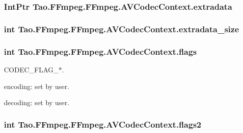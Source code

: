 \hypertarget{struct_tao_1_1_f_fmpeg_1_1_f_fmpeg_1_1_a_v_codec_context_a712a4bbdf50103256d35590cc403c482}{
\subsubsection[{extradata}]{\setlength{\rightskip}{0pt plus 5cm}IntPtr {\bf Tao.FFmpeg.FFmpeg.AVCodecContext.extradata}}}
\label{struct_tao_1_1_f_fmpeg_1_1_f_fmpeg_1_1_a_v_codec_context_a712a4bbdf50103256d35590cc403c482}
\hypertarget{struct_tao_1_1_f_fmpeg_1_1_f_fmpeg_1_1_a_v_codec_context_ac94887ce348e4f1dab611e079b2a8ea2}{
\subsubsection[{extradata\_\-size}]{\setlength{\rightskip}{0pt plus 5cm}int {\bf Tao.FFmpeg.FFmpeg.AVCodecContext.extradata\_\-size}}}
\label{struct_tao_1_1_f_fmpeg_1_1_f_fmpeg_1_1_a_v_codec_context_ac94887ce348e4f1dab611e079b2a8ea2}
\hypertarget{struct_tao_1_1_f_fmpeg_1_1_f_fmpeg_1_1_a_v_codec_context_ad8269b772f85e7a95dd82c9a6bdeab8f}{
\subsubsection[{flags}]{\setlength{\rightskip}{0pt plus 5cm}int {\bf Tao.FFmpeg.FFmpeg.AVCodecContext.flags}}}
\label{struct_tao_1_1_f_fmpeg_1_1_f_fmpeg_1_1_a_v_codec_context_ad8269b772f85e7a95dd82c9a6bdeab8f}
CODEC\_\-FLAG\_\-$\ast$.
\begin{DoxyItemize}
\item encoding: set by user.
\item decoding: set by user. 
\end{DoxyItemize}\hypertarget{struct_tao_1_1_f_fmpeg_1_1_f_fmpeg_1_1_a_v_codec_context_a28bb12c9c401b6240677df9f54ca88d1}{
\subsubsection[{flags2}]{\setlength{\rightskip}{0pt plus 5cm}int {\bf Tao.FFmpeg.FFmpeg.AVCodecContext.flags2}}}
